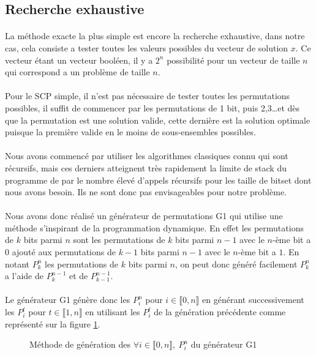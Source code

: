 \documentclass[12pt,letterpaper,twoside]{article}
\begin{document}
		\subsection{Recherche exhaustive}
			\paragraph*{}
				La méthode exacte la plus simple est encore la recherche exhaustive, dans notre cas, cela consiste a tester toutes les valeurs possibles du vecteur de solution \(x\). Ce vecteur étant un vecteur booléen, il y a \(2^n\) possibilité pour un vecteur de taille \(n\) qui correspond a un problème de taille \(n\).
			\paragraph*{}
				Pour le SCP simple, il n'est pas nécessaire de tester toutes les permutations possibles, il suffit de commencer par les permutations de 1 bit, puis 2,3\ldots et dès que la permutation est une solution valide, cette dernière est la solution optimale puisque la première valide en le moins de sous-ensembles possibles.
			\paragraph*{}
				Nous avons commencé par utiliser les algorithmes classiques connu qui sont récursifs, mais ces derniers atteignent très rapidement la limite de stack du programme de par le nombre élevé d'appels récursifs pour les taille de bitset dont nous avons besoin. Ils ne sont donc pas envisageables pour notre problème.
			\paragraph*{}
				Nous avons donc réalisé un générateur de permutations G1 qui utilise une méthode s'inspirant de la programmation dynamique. En effet les permutations de \(k\) bits parmi \(n\) sont les permutations de \(k\) bits parmi \(n-1\) avec le \(n\)-ème bit a \(0\) ajouté aux permutations de \(k-1\) bits parmi \(n-1\) avec le \(n\)-ème bit a \(1\). En notant \(P_k^n\) les permutations de \(k\) bits parmi \(n\), on peut donc généré facilement \(P_k^n\) a l'aide de \(P_k^{n-1}\) et de \(P_{k-1}^{n-1}\).
			\paragraph*{}
				Le générateur G1 génère donc les \(P_i^n\) pour \(i \in \llbracket 0, n \rrbracket\) en générant successivement les \(P_i^t\) pour \(t\in \llbracket 1, n \rrbracket\) en utilisant les \(P_i^t\) de la génération précédente comme représenté sur la figure \ref{fig:g1_permutations}.
			\begin{figure}[H]
				\centering%
				\resizebox{0.4\textwidth}{!}{}%
				\caption{Méthode de génération des \(\forall i \in \llbracket 0, n \rrbracket,\ P_i^n\) du générateur G1}%
				\label{fig:g1_permutations}%
			\end{figure}
\end{document}
